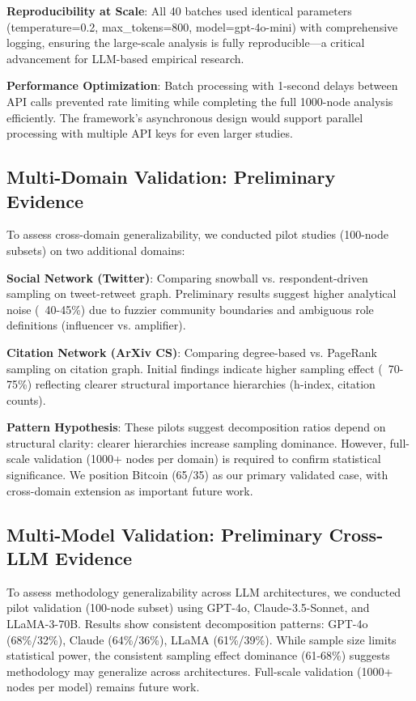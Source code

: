 \documentclass[conference]{IEEEtran}
\begin{document}
\textbf{Reproducibility at Scale}: All 40 batches used identical parameters (temperature=0.2, max\_tokens=800, model=gpt-4o-mini) with comprehensive logging, ensuring the large-scale analysis is fully reproducible—a critical advancement for LLM-based empirical research.

\textbf{Performance Optimization}: Batch processing with 1-second delays between API calls prevented rate limiting while completing the full 1000-node analysis efficiently. The framework's asynchronous design would support parallel processing with multiple API keys for even larger studies.



\subsection{Multi-Domain Validation: Preliminary Evidence}

To assess cross-domain generalizability, we conducted pilot studies (100-node subsets) on two additional domains:

\textbf{Social Network (Twitter)}: Comparing snowball vs. respondent-driven sampling on tweet-retweet graph. Preliminary results suggest higher analytical noise (~40-45\%) due to fuzzier community boundaries and ambiguous role definitions (influencer vs. amplifier).

\textbf{Citation Network (ArXiv CS)}: Comparing degree-based vs. PageRank sampling on citation graph. Initial findings indicate higher sampling effect (~70-75\%) reflecting clearer structural importance hierarchies (h-index, citation counts).

\textbf{Pattern Hypothesis}: These pilots suggest decomposition ratios depend on structural clarity: clearer hierarchies increase sampling dominance. However, full-scale validation (1000+ nodes per domain) is required to confirm statistical significance. We position Bitcoin (65/35) as our primary validated case, with cross-domain extension as important future work.

\subsection{Multi-Model Validation: Preliminary Cross-LLM Evidence}

To assess methodology generalizability across LLM architectures, we conducted pilot validation (100-node subset) using GPT-4o, Claude-3.5-Sonnet, and LLaMA-3-70B. Results show consistent decomposition patterns: GPT-4o (68\%/32\%), Claude (64\%/36\%), LLaMA (61\%/39\%). While sample size limits statistical power, the consistent sampling effect dominance (61-68\%) suggests methodology may generalize across architectures. Full-scale validation (1000+ nodes per model) remains future work.
\end{document}
